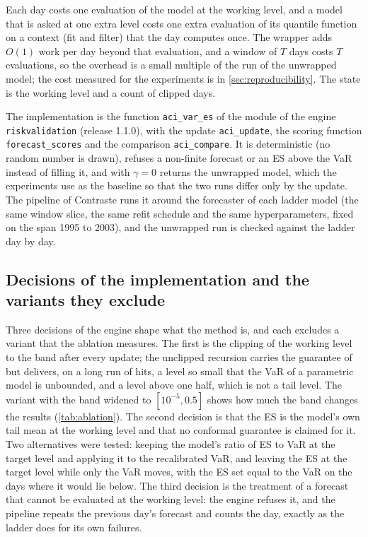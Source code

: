Each day costs one evaluation of the model at the working level, and a model that is asked at one extra level costs one extra evaluation of its quantile function on a context (fit and filter) that the day computes once. The wrapper adds $O(1)$ work per day beyond that evaluation, and a window of $T$ days costs $T$ evaluations, so the overhead is a small multiple of the run of the unwrapped model; the cost measured for the experiments is in \cref{sec:reproducibility}. The state is the working level and a count of clipped days.

The implementation is the function \texttt{aci\_var\_es} of the module  of the engine \texttt{riskvalidation} (release 1.1.0), with the update \texttt{aci\_update}, the scoring function \texttt{forecast\_scores} and the comparison \texttt{aci\_compare}. It is deterministic (no random number is drawn), refuses a non-finite forecast or an ES above the VaR instead of filling it, and with $\gamma = 0$ returns the unwrapped model, which the experiments use as the baseline so that the two runs differ only by the update. The pipeline of Contraste runs it around the forecaster of each ladder model (the same window slice, the same refit schedule and the same hyperparameters, fixed on the span 1995 to 2003), and the unwrapped run is checked against the ladder day by day.

\subsection{Decisions of the implementation and the variants they exclude}
\label{sec:method-decisions}

Three decisions of the engine shape what the method is, and each excludes a variant that the ablation measures. The first is the clipping of the working level to the band after every update; the unclipped recursion carries the guarantee of \citet{gibbs2021} but delivers, on a long run of hits, a level so small that the VaR of a parametric model is unbounded, and a level above one half, which is not a tail level. The variant with the band widened to $[10^{-5}, 0.5]$ shows how much the band changes the results (\cref{tab:ablation}). The second decision is that the ES is the model's own tail mean at the working level and that no conformal guarantee is claimed for it. Two alternatives were tested: keeping the model's ratio of ES to VaR at the target level and applying it to the recalibrated VaR, and leaving the ES at the target level while only the VaR moves, with the ES set equal to the VaR on the days where it would lie below. The third decision is the treatment of a forecast that cannot be evaluated at the working level: the engine refuses it, and the pipeline repeats the previous day's forecast and counts the day, exactly as the ladder does for its own failures.

